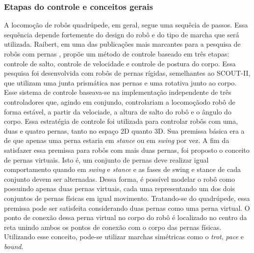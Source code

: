 \documentclass[../main.tex]{subfiles}
\begin{document}
  \subsubsection{Etapas do controle e conceitos gerais}
  A locomoção de robôs quadrúpede, em geral, segue uma sequêcia de passos. Essa sequência depende fortemente do design do robô e do tipo de marcha que será utilizada. Raibert, em uma das publicações mais marcantes para a pesquisa de robôs com pernas \cite{Raibert1986}, propõe um método de controle baseado em três etapas: controle de salto, controle de velocidade e controle de postura do corpo. Essa pesquisa foi desenvolvida com robôs de pernas rígidas, semelhantes ao SCOUT-II, que utilizam uma junta prismática nas pernas e uma rotativa junto ao corpo. Esse sistema de controle baseava-se na implementação independente de três controladores que, agindo em conjundo, controlariam a locomoçãodo robô de forma estável, a partir da velociade, a altura de salto do robô e o ângulo do corpo. Essa estratégia de controle foi utilizada para controlar robôs com uma, duas e quatro pernas, tanto no espaço 2D quanto 3D. Sua premissa básica era a de que apenas uma perna estaria em \textit{stance} ou em \textit{swing} por vez. A fim da satisfazer essa premissa para robôs com mais duas pernas, foi proposto o conceito de pernas virtuais. Isto é, um conjunto de pernas deve realizar igual comportamento quando em \textit{swing} e \textit{stance} e as fases de swing e stance de cada conjunto devem ser alternadas. Dessa forma, é possível modelar o robô como possuindo apenas duas pernas virtuais, cada uma representando um dos dois conjuntos de pernas físicas em igual movimento. Tratando-se do quadrúpede, essa premissa pode ser satisfeita considerando duas pernas como uma perna virtual. O ponto de conexão dessa perna virtual no corpo do robô é localizado no centro da reta unindo ambos os pontos de conexão com o corpo das pernas físicas. Utilizando esse conceito, pode-se utilizar marchas simétricas como o \textit{trot}, \textit{pace} e \textit{bound}.
\end{document}
